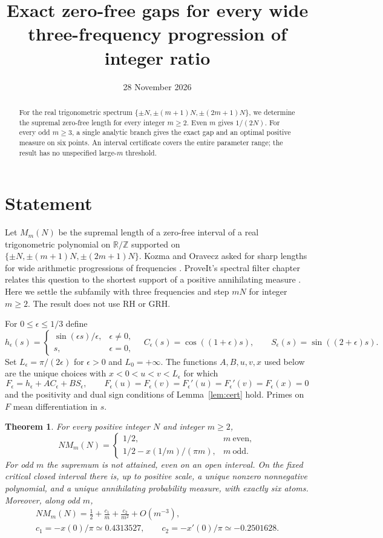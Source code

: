 \documentclass[11pt]{article}
\title{Exact zero-free gaps for every wide\\three-frequency progression of integer ratio}
\author{}
\date{28 November 2026}
\newtheorem{theorem}{Theorem}
\begin{document}
\maketitle
\vspace{-2em}
\begin{abstract}
For the real trigonometric spectrum \(\{\pm N,\pm(m+1)N,\pm(2m+1)N\}\),
we determine the supremal zero-free length for every integer \(m\ge2\).
Even \(m\) gives \(1/(2N)\). For every odd \(m\ge3\), a single
analytic branch gives the exact gap and an optimal positive measure
on six points. An interval certificate covers the entire parameter
range; the result has no unspecified large-\(m\) threshold.
\end{abstract}

\section{Statement}
Let \(M_m(N)\) be the supremal length of a zero-free interval
of a real trigonometric polynomial on \(\mathbb R/\mathbb Z\)
supported on \(\{\pm N,\pm(m+1)N,\pm(2m+1)N\}\).
Kozma and Oravecz asked for sharp lengths for wide arithmetic
progressions of frequencies \cite{KO}. ProveIt's spectral filter
chapter relates this question to the shortest support of a positive
annihilating measure \cite{ProveIt}. Here we settle the subfamily
with three frequencies and step \(mN\) for integer \(m\ge2\).
The result does not use RH or GRH.

For \(0\le\epsilon\le 1/3\) define
\[
 h_\epsilon(s)=
 \begin{cases}\sin(\epsilon s)/\epsilon,&\epsilon\ne0,\\s,&\epsilon=0,\end{cases}
 \quad C_\epsilon(s)=\cos((1+\epsilon)s),\qquad
 S_\epsilon(s)=\sin((2+\epsilon)s).
\]
Set \(L_\epsilon=\pi/(2\epsilon)\) for \(\epsilon>0\) and \(L_0=+\infty\).
The functions \(A,B,u,v,x\) used below are the unique choices with
\(x<0<u<v<L_\epsilon\) for which
\[
 F_\epsilon=h_\epsilon+A C_\epsilon+B S_\epsilon,\qquad
 F_\epsilon(u)=F_\epsilon(v)=F_\epsilon'(u)=F_\epsilon'(v)=F_\epsilon(x)=0
\]
and the positivity and dual sign conditions of Lemma~\ref{lem:cert} hold.
Primes on \(F\) mean differentiation in \(s\).

\begin{theorem}\label{thm:main}
For every positive integer \(N\) and integer \(m\ge2\),
\[
 NM_m(N)=
 \begin{cases}
  1/2,&m\ \text{even},\\[2pt]
  1/2-x(1/m)/(\pi m),&m\ \text{odd}.
 \end{cases}
\]
For odd \(m\) the supremum is not attained, even on an open interval.
On the fixed critical closed interval there is, up to positive scale,
a unique nonzero nonnegative polynomial, and a unique annihilating
probability measure, with exactly six atoms. Moreover, along odd \(m\),
\[
\begin{gathered}
 NM_m(N)=\frac12+\frac{c_1}{m}+\frac{c_2}{m^2}+O(m^{-3}),\\
 c_1=-x(0)/\pi \simeq 0.4313527,\qquad
 c_2=-x'(0)/\pi \simeq -0.2501628.
\end{gathered}
\]
\end{theorem}
\end{document}
